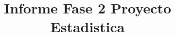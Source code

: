 \documentclass{article}
\begin{document}
    \title{Informe Fase 2 Proyecto Estadistica}
    \maketitle
\end{document}
